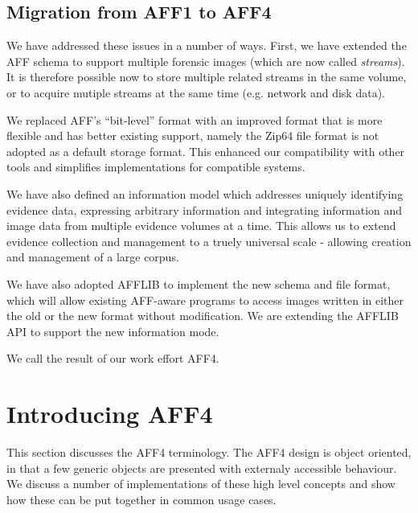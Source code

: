 \documentclass[10pt, conference]{IEEEtran}
\begin{document}
\subsection{Migration from AFF1 to AFF4}
We have addressed these issues in a number of ways. First, we have
extended the AFF schema to support multiple forensic images (which are
now called \emph{streams}). It is therefore possible now to store
multiple related streams in the same volume, or to acquire mutiple
streams at the same time (e.g. network and disk data).

We replaced AFF's ``bit-level'' format with an improved format that is
more flexible and has better existing support, namely the Zip64 file
format is not adopted as a default storage format. This enhanced our
compatibility with other tools and simplifies implementations for
compatible systems.

We have also defined an information model which addresses uniquely
identifying evidence data, expressing arbitrary information and
integrating information and image data from multiple evidence volumes
at a time. This allows us to extend evidence collection and management
to a truely universal scale - allowing creation and management of a
large corpus.

We have also adopted AFFLIB to implement the new schema and file
format, which will allow existing AFF-aware programs to access images
written in either the old or the new format without modification. We
are extending the AFFLIB API to support the new information mode.

We call the result of our work effort AFF4.

\section{Introducing AFF4}

This section discusses the AFF4 terminology. The AFF4 design is object
oriented, in that a few generic objects are presented with externaly
accessible behaviour. We discuss a number of implementations of these
high level concepts and show how these can be put together in common
usage cases.
\end{document}
